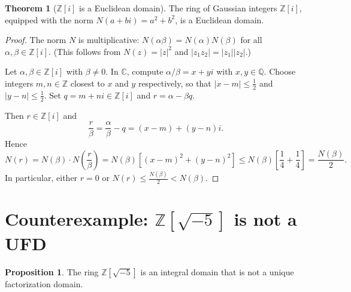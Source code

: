\documentclass[12pt,a4paper,openany]{book}
\theoremstyle{definition}
\newtheorem{theorem}{Theorem}[chapter]
\newtheorem{proposition}{Proposition}[chapter]
\theoremstyle{remark}
\begin{document}
\begin{theorem}[{$\mathbb{Z}[i]$ is a Euclidean domain}]\label{thm:Zi-euclidean}
The ring of Gaussian integers $\mathbb{Z}[i]$, equipped with the norm $N(a+bi)=a^2+b^2$, is a Euclidean domain.
\end{theorem}

\begin{proof}
The norm $N$ is multiplicative: $N(\alpha\beta)=N(\alpha)N(\beta)$ for all $\alpha,\beta\in\mathbb{Z}[i]$. (This follows from $N(z)=|z|^2$ and $|z_1z_2|=|z_1||z_2|$.)

Let $\alpha,\beta\in\mathbb{Z}[i]$ with $\beta\neq 0$. In $\mathbb{C}$, compute $\alpha/\beta=x+yi$ with $x,y\in\mathbb{Q}$. Choose integers $m,n\in\mathbb{Z}$ closest to $x$ and $y$ respectively, so that $|x-m|\leq\frac{1}{2}$ and $|y-n|\leq\frac{1}{2}$. Set $q=m+ni\in\mathbb{Z}[i]$ and $r=\alpha-\beta q$.

Then $r\in\mathbb{Z}[i]$ and
\[
    \frac{r}{\beta}=\frac{\alpha}{\beta}-q=(x-m)+(y-n)i.
\]
Hence
\[
    N(r)=N(\beta)\cdot N\!\left(\frac{r}{\beta}\right) = N(\beta)\left[(x-m)^2+(y-n)^2\right] \leq N(\beta)\left[\frac{1}{4}+\frac{1}{4}\right] = \frac{N(\beta)}{2}.
\]
In particular, either $r=0$ or $N(r)\leq\frac{N(\beta)}{2}<N(\beta)$.
\end{proof}

\section{Counterexample: \texorpdfstring{$\mathbb{Z}[\sqrt{-5}]$}{Z[sqrt(-5)]} is not a UFD}\label{sec:counterexample}

\begin{proposition}\label{prop:Z-sqrt-5-not-UFD}
The ring $\mathbb{Z}[\sqrt{-5}]$ is an integral domain that is not a unique factorization domain.
\end{proposition}
\end{document}
